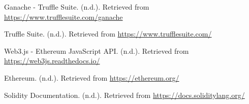 \documentclass[11pt]{article}
\begin{document}
\clearpage
\begin{thebibliography}{99}
Ganache - Truffle Suite. (n.d.). Retrieved from \url{https://www.trufflesuite.com/ganache}

Truffle Suite. (n.d.). Retrieved from \url{https://www.trufflesuite.com/}

Web3.js - Ethereum JavaScript API. (n.d.). Retrieved from \url{https://web3js.readthedocs.io/}

Ethereum. (n.d.). Retrieved from \url{https://ethereum.org/}

Solidity Documentation. (n.d.). Retrieved from \url{https://docs.soliditylang.org/}
\end{thebibliography}
\end{document}
